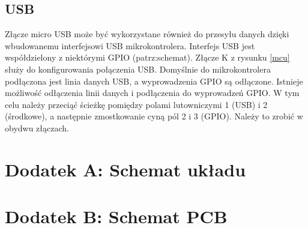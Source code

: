 \documentclass[11pt, hidelinks, a4paper]{report}
\begin{document}
	\section{USB}
		Złącze micro USB może być wykorzystane również do przesyłu danych dzięki wbudowanemu interfejsowi USB mikrokontrolera. Interfejs USB jest współdzielony z niektórymi GPIO (patrz:schemat). Złącze K z rysunku \ref{mcu} służy do konfigurowania połączenia USB. Domyślnie do mikrokontrolera podłączona jest linia danych USB, a wyprowadzenia GPIO są odłączone. Istnieje możliwość odłączenia linii danych i podłączenia do wyprowadzeń GPIO. W tym celu należy przeciąć ścieżkę pomiędzy polami lutowniczymi 1 (USB) i 2 (środkowe), a następnie zmostkowanie cyną pól 2 i 3 (GPIO). Należy to zrobić w obydwu złączach.
	
	\chapter{Dodatek A: Schemat układu}
		
	\chapter{Dodatek B: Schemat PCB}
		
\end{document}
